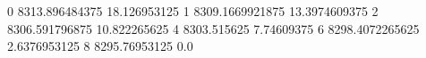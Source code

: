 0 8313.896484375 18.126953125
1 8309.1669921875 13.3974609375
2 8306.591796875 10.822265625
4 8303.515625 7.74609375
6 8298.4072265625 2.6376953125
8 8295.76953125 0.0
